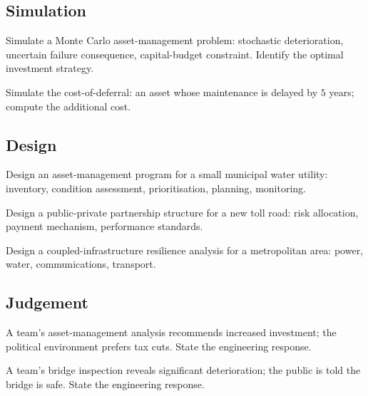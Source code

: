 \subsection*{Simulation}

\begin{exercise}
Simulate a Monte Carlo asset-management problem: stochastic deterioration, uncertain failure consequence, capital-budget constraint. Identify the optimal investment strategy.
\end{exercise}

\begin{exercise}
Simulate the cost-of-deferral: an asset whose maintenance is delayed by $5$ years; compute the additional cost.
\end{exercise}

\subsection*{Design}

\begin{exercise}
Design an asset-management program for a small municipal water utility: inventory, condition assessment, prioritisation, planning, monitoring.
\end{exercise}

\begin{exercise}
Design a public-private partnership structure for a new toll road: risk allocation, payment mechanism, performance standards.
\end{exercise}

\begin{exercise}
Design a coupled-infrastructure resilience analysis for a metropolitan area: power, water, communications, transport.
\end{exercise}

\subsection*{Judgement}

\begin{exercise}
A team's asset-management analysis recommends increased investment; the political environment prefers tax cuts. State the engineering response.
\end{exercise}

\begin{exercise}
A team's bridge inspection reveals significant deterioration; the public is told the bridge is safe. State the engineering response.
\end{exercise}

